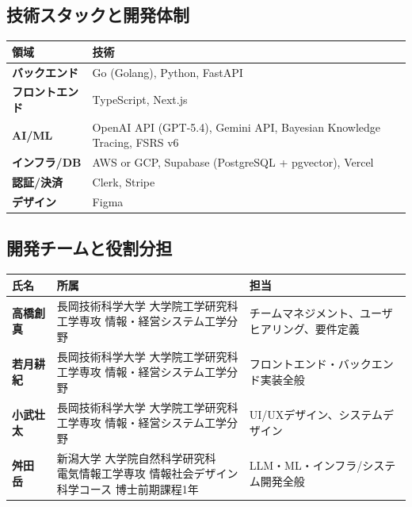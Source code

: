 \documentclass[paper=a4,fontsize=10.5bp,jafontsize=10.5bp,twocolumn]{jlreq}
\begin{document}
\subsection{技術スタックと開発体制}

\begin{scriptsize}\noindent
\begin{tabularx}{\linewidth}{>{\bfseries}l X}
\toprule
領域 & 技術 \\
\midrule
バックエンド & Go (Golang), Python, FastAPI \\
フロントエンド & TypeScript, Next.js \\
AI/ML & OpenAI API (GPT-5.4), Gemini API, Bayesian Knowledge Tracing, FSRS v6 \\
インフラ/DB & AWS or GCP, Supabase (PostgreSQL + pgvector), Vercel \\
認証/決済 & Clerk, Stripe \\
デザイン & Figma \\
\bottomrule
\end{tabularx}
\end{scriptsize}

\subsection{開発チームと役割分担}

\begin{scriptsize}\noindent
\begin{tabularx}{\linewidth}{>{\bfseries}l l X}
\toprule
氏名 & 所属 & 担当 \\
\midrule
高橋創真 & \parbox[t]{3.2cm}{長岡技術科学大学 大学院工学研究科\\工学専攻 情報・経営システム工学分野} & チームマネジメント、ユーザヒアリング、要件定義 \\[4pt]
若月耕紀 & \parbox[t]{3.2cm}{長岡技術科学大学 大学院工学研究科\\工学専攻 情報・経営システム工学分野} & フロントエンド・バックエンド実装全般 \\[4pt]
小武壮太 & \parbox[t]{3.2cm}{長岡技術科学大学 大学院工学研究科\\工学専攻 情報・経営システム工学分野} & UI/UXデザイン、システムデザイン \\[4pt]
舛田　岳 & \parbox[t]{3.2cm}{新潟大学 大学院自然科学研究科\\電気情報工学専攻 情報社会デザイン科学コース 博士前期課程1年} & LLM・ML・インフラ/システム開発全般 \\
\bottomrule
\end{tabularx}
\end{scriptsize}
\end{document}
